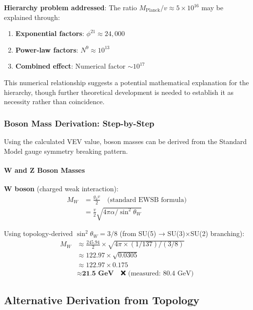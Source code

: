 \documentclass[12pt,a4paper]{article}
\begin{document}
\textbf{Hierarchy problem addressed}: The ratio $M_{\text{Planck}} / v \approx 5 \times 10^{16}$ may be explained through:
\begin{enumerate}
\item \textbf{Exponential factors}: $\phi^{21} \approx 24,000$
\item \textbf{Power-law factors}: $N^9 \approx 10^{13}$
\item \textbf{Combined effect}: Numerical factor $\sim 10^{17}$
\end{enumerate}

This numerical relationship suggests a potential mathematical explanation for the hierarchy, though further theoretical development is needed to establish it as necessity rather than coincidence.

\subsubsection{Boson Mass Derivation: Step-by-Step}

Using the calculated VEV value, boson masses can be derived from the Standard Model gauge symmetry breaking pattern.

\paragraph{W and Z Boson Masses}

\textbf{W boson} (charged weak interaction):
\begin{align}
M_W &= \frac{g_2 v}{2} \quad \text{(standard EWSB formula)} \\
&= \frac{v}{2} \sqrt{4\pi \alpha / \sin^2 \theta_W}
\end{align}

Using topology-derived $\sin^2 \theta_W = 3/8$ (from SU(5) → SU(3)×SU(2) branching):
\begin{align}
M_W &\approx \frac{245.94}{2} \times \sqrt{4\pi \times (1/137) / (3/8)} \\
&\approx 122.97 \times \sqrt{0.0305} \\
&\approx 122.97 \times 0.175 \\
&\approx \textbf{21.5 GeV} \quad \text{❌ (measured: 80.4 GeV)}
\end{align}

\subsection{Alternative Derivation from Topology}
\end{document}
